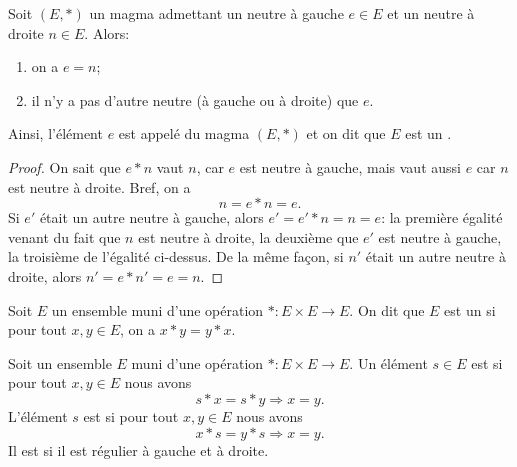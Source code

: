 \begin{propositionDef}		\label{PROPooDEFMagmaUnifere}
	Soit \( (E, *) \) un magma admettant un neutre à gauche \( e \in E \) et un neutre à droite \( n \in E \). Alors:
	\begin{enumerate}
		\item
		      on a \( e = n \);
		\item
		      il n'y a pas d'autre neutre (à gauche ou à droite) que \( e \).
	\end{enumerate}
	Ainsi, l'élément \( e \) est appelé  du magma \( (E, *) \) et on dit que  \( E \) est un .
\end{propositionDef}

\begin{proof}
	On sait que \( e*n \) vaut \( n \), car \( e \) est neutre à gauche, mais vaut aussi \( e \) car \( n \) est neutre à droite. Bref, on a
	\[
		n = e*n = e.
	\]
	Si \( e' \) était un autre neutre à gauche, alors \( e' = e' * n = n = e \): la première égalité venant du fait que \( n \) est neutre à droite, la deuxième que \( e' \) est neutre à gauche, la troisième de l'égalité ci-dessus. De la même façon, si \( n' \) était un autre neutre à droite, alors \( n' = e*n' = e = n \).
\end{proof}

\begin{definition}	\label{DEFooMagmaCommutatif}
	Soit \( E \) un ensemble muni d'une opération \( *\colon E\times E\to E\). On dit que \( E \) est un  si pour tout \( x, y \in E \), on a \( x * y = y * x\).
\end{definition}

\begin{definition}        \label{DEFooIJIEooZaAdSs}
	Soit un ensemble \( E\) muni d'une opération \( *\colon E\times E\to E\). Un élément \( s\in E\) est  si pour tout \( x,y\in E\) nous avons
	\begin{equation}
		s*x=s*y\Rightarrow x=y.
	\end{equation}
	L'élément \( s\) est  si pour tout \( x,y\in E\) nous avons
	\begin{equation}
		x*s=y*s\Rightarrow x=y.
	\end{equation}
	Il est  si il est régulier à gauche et à droite.
\end{definition}

